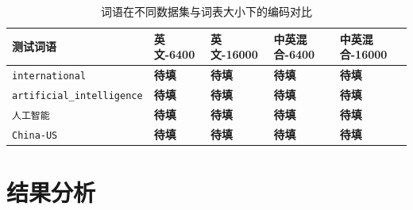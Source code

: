 \documentclass[a4paper,12pt]{ctexart} %
\begin{document}
\begin{table}[H]
    \centering
    \caption{词语在不同数据集与词表大小下的编码对比}
    \begin{tabular}{p{} p{} p{} p{} p{}}
        \toprule
        测试词语 & 英文-6400 & 英文-16000 & 中英混合-6400 & 中英混合-16000 \\
        \midrule
        \texttt{international} & \textbf{待填} & \textbf{待填} & \textbf{待填} & \textbf{待填} \\
        \texttt{artificial\_intelligence} & \textbf{待填} & \textbf{待填} & \textbf{待填} & \textbf{待填} \\
        \texttt{人工智能} & \textbf{待填} & \textbf{待填} & \textbf{待填} & \textbf{待填} \\
        \texttt{China-US} & \textbf{待填} & \textbf{待填} & \textbf{待填} & \textbf{待填} \\
        \bottomrule
    \end{tabular}
\end{table}


\section{结果分析}
\end{document}
